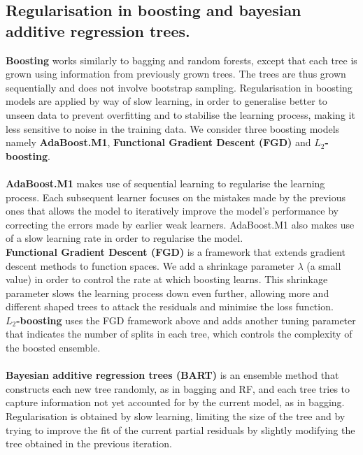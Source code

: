 \documentclass[12pt]{article}
\begin{document}
\subsection*{Regularisation in boosting and bayesian additive regression trees.}
\textbf{Boosting} works similarly to bagging and random forests, except that each tree is grown using information from previously grown trees. The trees are thus grown sequentially and does not involve bootstrap sampling.
Regularisation in boosting models are applied by way of slow learning, in order to generalise better to unseen data to prevent overfitting and to stabilise the learning process, making it less sensitive to noise in the training data.
We consider three boosting models namely \textbf{AdaBoost.M1}, \textbf{Functional Gradient Descent (FGD)} and \textbf{$L_{2}$-boosting}.
\\ \\
\textbf{AdaBoost.M1} makes use of sequential learning to regularise the learning process. Each subsequent learner focuses on the mistakes made by the previous ones
that allows the model to iteratively improve the model's performance by correcting the errors made by earlier weak learners. 
AdaBoost.M1 also makes use of a slow learning rate in order to regularise the model.\\
\textbf{Functional Gradient Descent (FGD)} is a framework that extends gradient descent methods to function spaces.
We add a shrinkage parameter $\lambda$ (a small value) in order to control the rate at which boosting learns. This shrinkage parameter 
slows the learning process down even further, allowing more and different shaped trees to attack the residuals and minimise the loss function. \\
\textbf{$L_{2}$-boosting} uses the FGD framework above and adds another tuning parameter that indicates the number of splits in each tree, which controls the complexity of the boosted ensemble.
\\ \\
\textbf{Bayesian additive regression trees (BART)} is an ensemble method that constructs each new tree randomly, as in bagging and RF, and each tree tries to capture information not yet accounted 
for by the current model, as in bagging. Regularisation is obtained by slow learning, limiting the size of the tree and by trying to improve the fit of the current partial residuals by slightly modifying the tree obtained in the previous iteration.
\end{document}
